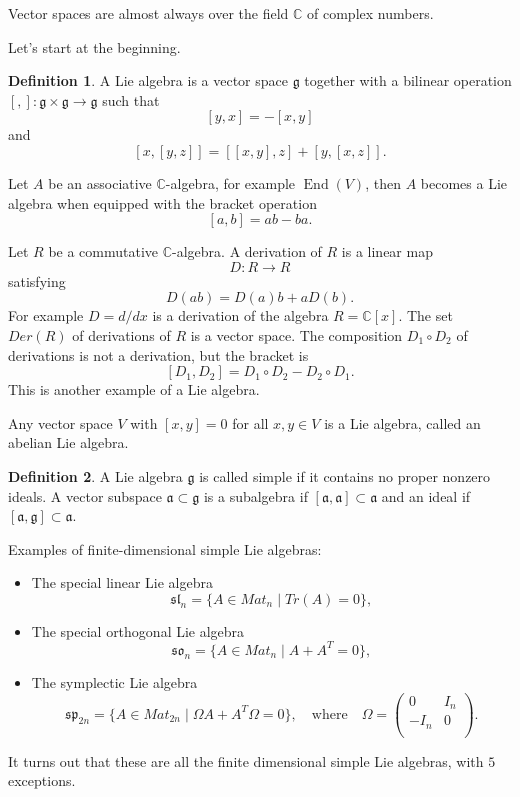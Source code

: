 \documentclass[12pt]{article}
\theoremstyle{plain}
\theoremstyle{definition}
\newtheorem{defn}{Definition}[section]
\numberwithin{equation}{section}
\DeclareMathOperator{\en}{End}
\newcommand{\C}{\mathbb{C}}
\newcommand{\g}{\mathfrak{g}}
\newcommand{\ma}{\mathfrak{a}}
\newcommand{\tbt}[4]{\left(\begin{array}{cc} #1 & #2 \\ #3 & #4 \\ \end{array}\right)}
\begin{document}
Vector spaces are almost always over the field $\C$ of complex numbers.

Let's start at the beginning.
\begin{defn}
A Lie algebra is a vector space $\g$ together with a bilinear operation $[,] : \g \times \g \rightarrow \g$ such that
\[
[y, x] = -[x, y]
\]
and
\[
[x, [y, z]] = [[x, y], z] + [y, [x, z]].
\]
\end{defn}

Let $A$ be an associative $\C$-algebra, for example $\en(V)$, then $A$ becomes a Lie algebra when equipped with the bracket operation
\[
[a, b] = ab - ba.
\]

Let $R$ be a commutative $\C$-algebra. A derivation of $R$ is a linear map
\[
D : R \rightarrow R
\]
satisfying
\[
D(ab) = D(a)b + aD(b).
\]
For example $D = d/dx$ is a derivation of the algebra $R = \C[x]$.
The set $Der(R)$ of derivations of $R$ is a vector space. The composition $D_1 \circ D_2$ of derivations is not a derivation, but the bracket is
\[
[D_1, D_2] = D_1 \circ D_2 - D_2 \circ D_1.
\]
This is another example of a Lie algebra.


Any vector space $V$ with $[x, y] = 0$ for all $x, y \in V$ is a Lie algebra, called an abelian Lie algebra.

\begin{defn}
A Lie algebra $\g$ is called simple if it contains no proper nonzero ideals. A vector subspace $\ma \subset \g$ is a subalgebra if $[\ma, \ma] \subset \ma$ and an ideal if $[\ma, \g] \subset \ma$.
\end{defn}



Examples of finite-dimensional simple Lie algebras:
\begin{itemize}
\item The special linear Lie algebra
\[
\mathfrak{sl}_n = \{A \in Mat_{n} \mid Tr(A) = 0 \},
\]

\item The special orthogonal Lie algebra
\[
\mathfrak{so}_n = \{A \in Mat_{n} \mid A + A^T = 0\},
\]

\item The symplectic Lie algebra
\[
\mathfrak{sp}_{2n} = \{A \in Mat_{2n} \mid \Omega A + A^T \Omega = 0\}, \quad \text{where} \quad \Omega = \tbt{0}{I_n}{-I_n}{0}.
\]
\end{itemize}
It turns out that these are all the finite dimensional simple Lie algebras, with $5$ exceptions.
\end{document}
